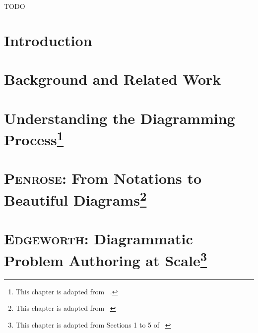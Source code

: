 \documentclass[12pt]{cmuthesis}
\newcommand*{\Penrose}{\textsc{Penrose}\xspace}
\newcommand*{\Edgeworth}{\textsc{Edgeworth}\xspace}
\begin{document}
\begin{acknowledgments}
TODO
\end{acknowledgments}


\tableofcontents

\mainmatter


%
%
%
%
%


% 
\chapter{Introduction}


\chapter{Background and Related Work}
\label{chp:background}


\chapter[Understanding the Diagramming Process]{Understanding the Diagramming Process\footnote{This chapter is adapted from ~\cite{naturalDiagramming}.}}
\label{chp:interviews}


\chapter[\Penrose: From Notations to Beautiful Diagrams]{\Penrose: From Notations to Beautiful Diagrams\footnote{
This chapter is adapted from ~\cite{penrose}
}}
\label{chp:penrose}



\chapter[\Edgeworth: Diagrammatic Problem Authoring at Scale]{\Edgeworth: Diagrammatic Problem Authoring at Scale\footnote{This chapter is adapted from Sections 1 to 5 of ~\cite{ni_edgeworth_2024}}}
\label{chp:edgeworth}

\end{document}
